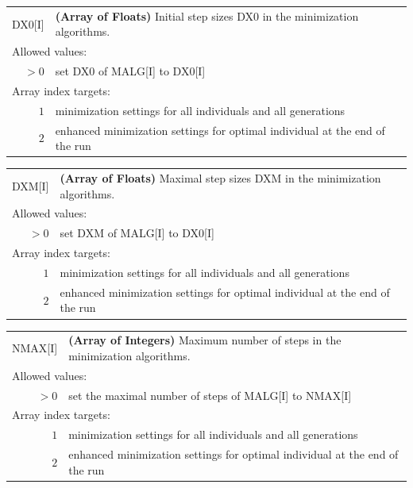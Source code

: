 \documentclass[10pt,a4paper,openany]{memoir}
\numberwithin{equation}{section}
\begin{document}
{
\begin{tabular}{r@{ : }l}
\label{descr:dx0}
       DX0[I]&\textbf{(Array of Floats)} Initial step sizes DX0 in the minimization algorithms.                                               \\ 
\multicolumn{2}{l}{Allowed values:} \\ 
    \(>0\)&set DX0 of MALG[I] to DX0[I]                                                                         \\ 
\multicolumn{2}{l}{Array index targets:} \\ 
     \(1\)&minimization settings for all individuals and all generations \\
     \(2\)&enhanced minimization settings for optimal individual at the end of the run \\
\end{tabular}
\vspace{1ex}
}

{
\begin{tabular}{r@{ : }l}
\label{descr:dxm}
  DXM[I]&\textbf{(Array of Floats)} Maximal step sizes DXM in the minimization algorithms.                                               \\ 
\multicolumn{2}{l}{Allowed values:} \\ 
  \(>0\)&set DXM of MALG[I] to DX0[I]                                                                         \\ 
\multicolumn{2}{l}{Array index targets:} \\ 
  \(1\)&minimization settings for all individuals and all generations \\
  \(2\)&enhanced minimization settings for optimal individual at the end of the run \\
\end{tabular}
\vspace{1ex}
}

{
\begin{tabular}{r@{ : }l}
\label{descr:nmax}
      NMAX[I]&\textbf{(Array of Integers)} Maximum number of steps in the minimization algorithms.                                              \\ 
\multicolumn{2}{l}{Allowed values:} \\ 
    \(>0\)&set the maximal number of steps of MALG[I] to NMAX[I]                                                \\ 
\multicolumn{2}{l}{Array index targets:} \\ 
  \(1\)&minimization settings for all individuals and all generations \\
  \(2\)&enhanced minimization settings for optimal individual at the end of the run \\
\end{tabular}
\vspace{1ex}
}
\end{document}
